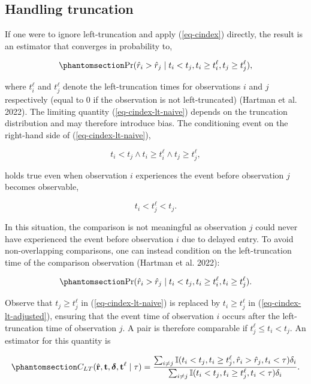 \documentclass[
  letterpaper,
  krantz2]{style/krantz}
\begin{document}
\subsection{Handling truncation}\label{handling-truncation}

If one were to ignore left-truncation  and apply
(\ref{eq-cindex}) directly, the result is an estimator that converges in
probability to,

\begin{equation}\phantomsection\label{eq-cindex-lt-naive}{
\Pr(\hat{r}_i > \hat{r}_j  \mid  t_i < t_j, t_i \geq t^\ell_i, t_j \geq t^\ell_j),
}\end{equation}

where \(t^\ell_i\) and \(t^\ell_j\) denote the left-truncation times for
observations \(i\) and \(j\) respectively (equal to \(0\) if the
observation is not left-truncated) (Hartman et al. 2022). The limiting
quantity (\ref{eq-cindex-lt-naive}) depends on the truncation
distribution and may therefore introduce bias. The conditioning event on
the right-hand side of (\ref{eq-cindex-lt-naive}),

\[
t_i < t_j \wedge t_i \geq t^\ell_i \wedge t_j \geq t^\ell_j,
\]

holds true even when observation \(i\) experiences the event before
observation \(j\) becomes observable,

\[
t_i < t_j^\ell < t_j.
\]

In this situation, the comparison is not meaningful as observation \(j\)
could never have experienced the event before observation \(i\) due to
delayed entry. To avoid non-overlapping
comparisons, one can instead condition on the left-truncation time of
the comparison observation (Hartman et al. 2022):

\begin{equation}\phantomsection\label{eq-cindex-lt-adjusted}{
\Pr(\hat{r}_i > \hat{r}_j  \mid  t_i < t_j, t_i \geq t^\ell_i, t_i \geq t^\ell_j).
}\end{equation}

Observe that \(t_j \ge t_j^\ell\) in (\ref{eq-cindex-lt-naive}) is
replaced by \(t_i \ge t_j^\ell\) in (\ref{eq-cindex-lt-adjusted}),
ensuring that the event time of observation \(i\) occurs after the
left-truncation time of observation \(j\). A pair is therefore
comparable if \(t^\ell_j \le t_i < t_j\). An estimator for this quantity
is

\begin{equation}\phantomsection\label{eq-concordance-lt}{
C_{LT}(\hat{\mathbf{r}}, \mathbf{t}, \boldsymbol{\delta}, \mathbf{t}^\ell \mid \tau) = \frac{\sum_{i\neq j} \mathbb{I}(t_i < t_j, t_i \geq t^\ell_j, \hat{r}_i > \hat{r}_j, t_i < \tau)\delta_i}{\sum_{i\neq j}\mathbb{I}(t_i < t_j, t_i \geq t^\ell_j, t_i < \tau)\delta_i}.
}\end{equation}
\end{document}
